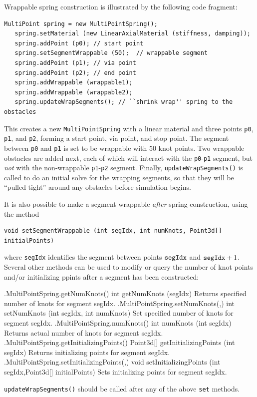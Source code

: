 Wrappable spring construction is illustrated by the following code
fragment:
%
\begin{lstlisting}[]
   MultiPoint spring = new MultiPointSpring();
   spring.setMaterial (new LinearAxialMaterial (stiffness, damping));
   spring.addPoint (p0); // start point
   spring.setSegmentWrappable (50);  // wrappable segment
   spring.addPoint (p1); // via point
   spring.addPoint (p2); // end point
   spring.addWrappable (wrappable1);
   spring.addWrappable (wrappable2);
   spring.updateWrapSegments(); // ``shrink wrap'' spring to the obstacles
\end{lstlisting}
%
This creates a new {\tt MultiPointSpring} with a linear material and
three points {\tt p0}, {\tt p1}, and {\tt p2}, forming a start point,
via point, and stop point.  The segment between {\tt p0} and {\tt p1}
is set to be wrappable with 50 knot points. Two wrappable obstacles
are added next, each of which will interact with the {\tt p0}-{\tt p1}
segment, but {\it not} with the non-wrappable {\tt p1}-{\tt p2}
segment. Finally, {\tt updateWrapSegments()} is called to do an
initial solve for the wrapping segments, so that they will be ``pulled
tight'' around any obstacles before simulation begins.

It is also possible to make a segment wrappable {\it after}
spring construction, using the method
%
\begin{lstlisting}[]
   void setSegmentWrappable (int segIdx, int numKnots, Point3d[] initialPoints)
\end{lstlisting}
%
where {\tt segIdx} identifies the segment between points ${\tt segIdx}$ and
${\tt segIdx}+1$. Several other methods can be used to modify or query the
number of knot points and/or initializing ppints after a segment has been
constructed:
%
\begin{methodtable}{0.5}{0.5}
\midline
%
\methodentry
{\mech.MultiPointSpring.getNumKnots()}%
{int getNumKnots (segIdx)}%
{Returns specified number of knots for segment segIdx.}%
%
\methodentry
{\mech.MultiPointSpring.setNumKnots(,)}%
{int setNumKnots (int segIdx, int numKnots)}%
{Set specified number of knots for segment segIdx.}%
%
\methodentry
{\mech.MultiPointSpring.numKnots()}%
{int numKnots (int segIdx)}%
{Returns actual number of knots for segment segIdx.}%
%
\methodspace{0.5em}%
\methodentry
{\mech.MultiPointSpring.getInitializingPoints()}%
{Point3d[] getInitializingPoints (int segIdx)}%
{Returns initializing points for segment segIdx.}%
%
\methodentry
{\mech.MultiPointSpring.setInitializingPoints(,)}%
{void setInitializingPoints (int segIdx,\brh Point3d[] initialPoints)}%
{Sets initializing points for segment segIdx.}%
%
\midline
\end{methodtable}
%
{\tt updateWrapSegments()} should be called after any of the above {\tt set}
methods.

